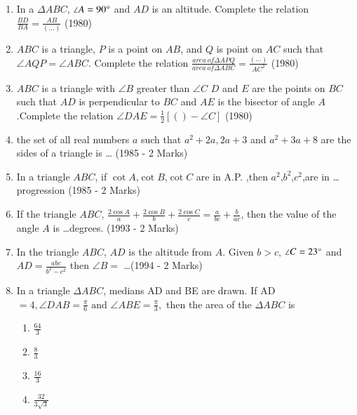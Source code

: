 
\begin{enumerate}[label=\thesubsection.\arabic*,ref=\thesubsection.\theenumi]
    \item In a $\Delta ABC$, $\angle A=90\degree$ and $AD$ is an altitude. Complete the relation\\
    $\frac{BD}{BA} = \frac{AB}{(\dots)}$
    \hfill (1980)
    
    \item $ABC$ is a triangle, $P$ is a point on $AB$, and $Q$ is point on $AC$ such that $\angle AQP = \angle ABC$. Complete the relation
    $\frac{area\ of \Delta APQ}{area\ of \Delta ABC} =\frac{(\dots)}{AC^2}$
    \hfill (1980)
    
    \item $ABC$ is a triangle with $\angle B $ greater than $\angle C$ 
    $D$ and $E$ are the points on $BC$ such that $AD$ is perpendicular to $BC$ and $AE$ is the bisector of angle $A$ .Complete the relation
    $\angle DAE = \frac{1}{2} [( ) - \angle C]$
    \hfill (1980)
    \item the set of all real numbers $a$ such that $a^2 + 2a, 2a + 3$ and $a^2 + 3a + 8$ are the sides of a triangle is \dots
    \hfill (1985 - 2 Marks)
    \item In a triangle $ABC$, if $\cot A$,$\cot B$,$\cot C$ are in A.P. ,then $a^2$,$b^2$,$c^2$,are in \dots progression \hfill (1985 - 2 Marks)
    \item If the triangle $ABC$, $\frac{2\cos A}{a} + \frac{2\cos B}{b} + \frac{2\cos C}{c} = \frac{a}{bc} +  \frac{b}{ac}$, then the value of the angle $A$ is \dots degrees. \hfil (1993 - 2 Marks)
    \item In the triangle $ABC$, $AD$ is the altitude from $A$. Given $b>c$, $\angle C=23 \degree$ and $AD = \frac{abc}{b^2 - c^2}$ then $\angle B = $ \dots \hfill (1994 - 2 Marks)

\item In a triangle $\Delta{ABC}$, medians AD and BE are drawn. If AD$=4,\angle{DAB}=\frac{\pi}{6} \text{ and } \angle{ABE}=\frac{\pi}{3},$ then the area of the $\Delta{ABC}$ is \hfill{}
\begin{multicols}{4}
\begin{enumerate}
        \item $\frac{64}{3}$                    
        \item $\frac{8}{3}$ 
        \item $\frac{16}{3}$ 
        \item $\frac{32}{3\sqrt{3}}$
\end{enumerate}
\end{multicols} 


\end{enumerate}
